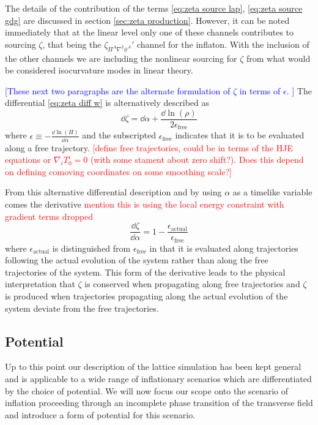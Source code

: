 The details of the contribution of the terms \eqref{eq:zeta source lap}, \eqref{eq:zeta source gdg} are discussed in section \ref{sec:zeta production}. However, it can be noted immediately that at the linear level only one of these channels contributes to sourcing $\zeta$, that being the $\zeta_{\Pi^A\nabla^2\phi^A}'$ channel for the inflaton. With the inclusion of the  other channels we are including the nonlinear sourcing for $\zeta$ from what would be considered isocurvature modes in linear theory.

\textcolor{blue}{[These next two paragraphs are the alternate formulation of $\zeta$ in terms of $\epsilon$. ]}
The differential \eqref{eq:zeta diff w} is alternatively described as
\begin{equation}
  \dd\zeta = \dd\alpha + \frac{\dd\ln(\rho)}{2\epsilon_\mathrm{free}} \label{eq:zeta diff eps}
\end{equation}
where $\epsilon \equiv -\frac{\dd\ln(H)}{\dd\alpha}$ and the subscripted $\epsilon_\mathrm{free}$ indicates that it is to be evaluated along a free trajectory. \textcolor{red}{[define free trajectories, could be in terms of the HJE equations or $\nabla_iT^i_0 = 0$ (with some stament about zero shift?). Does this depend on defining comoving coordinates on some smoothing scale?]}

From this alternative differential description and by using $\alpha$ as a timelike variable comes the derivative \textcolor{red}{mention this is using the local energy constraint with gradient terms dropped}
\begin{equation}
  \frac{\dd\zeta}{\dd\alpha} = 1 - \frac{\epsilon_\mathrm{actual}}{\epsilon_\mathrm{free}} \label{eq:zeta der alpha}
\end{equation}
where $\epsilon_\mathrm{actual}$ is distinguished from $\epsilon_\mathrm{free}$ in that it is evaluated along trajectories following the actual evolution of the system rather than along the free trajectories of the system. This form of the derivative leads to the physical interpretation that $\zeta$ is conserved when propagating along free trajectories and $\zeta$ is produced when trajectories propagating along the actual evolution of the system deviate from the free trajectories.

\subsection{Potential} \label{sec:potential}
Up to this point our description of the lattice simulation has been kept general and is applicable to a wide range of inflationary scenarios which are differentiated by the choice of potential.
We will now focus our scope onto the scenario of inflation proceeding through an incomplete phase transition of the transverse field and introduce a form of potential for this scenario.

